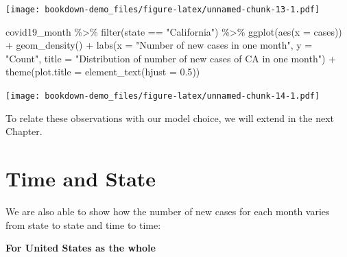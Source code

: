 \documentclass[
]{book}
\newenvironment{Shaded}{\begin{snugshade}}{\end{snugshade}}
\newcommand{\AttributeTok}[1]{\textcolor[rgb]{0.77,0.63,0.00}{#1}}
\newcommand{\FloatTok}[1]{\textcolor[rgb]{0.00,0.00,0.81}{#1}}
\newcommand{\FunctionTok}[1]{\textcolor[rgb]{0.00,0.00,0.00}{#1}}
\newcommand{\NormalTok}[1]{#1}
\newcommand{\SpecialCharTok}[1]{\textcolor[rgb]{0.00,0.00,0.00}{#1}}
\newcommand{\StringTok}[1]{\textcolor[rgb]{0.31,0.60,0.02}{#1}}
\begin{document}
\texttt{[image: bookdown-demo\_files/figure-latex/unnamed-chunk-13-1.pdf]}

\begin{Shaded}
\begin{Highlighting}[]
\NormalTok{covid19\_month }\SpecialCharTok{\%\textgreater{}\%}
  \FunctionTok{filter}\NormalTok{(state }\SpecialCharTok{==} \StringTok{"California"}\NormalTok{) }\SpecialCharTok{\%\textgreater{}\%}
  \FunctionTok{ggplot}\NormalTok{(}\FunctionTok{aes}\NormalTok{(}\AttributeTok{x =}\NormalTok{ cases)) }\SpecialCharTok{+}
  \FunctionTok{geom\_density}\NormalTok{() }\SpecialCharTok{+}
  \FunctionTok{labs}\NormalTok{(}\AttributeTok{x =} \StringTok{"Number of new cases in one month"}\NormalTok{, }\AttributeTok{y =} \StringTok{"Count"}\NormalTok{, }\AttributeTok{title =} \StringTok{"Distribution of number of new cases of CA in one month"}\NormalTok{) }\SpecialCharTok{+}
  \FunctionTok{theme}\NormalTok{(}\AttributeTok{plot.title =} \FunctionTok{element\_text}\NormalTok{(}\AttributeTok{hjust =} \FloatTok{0.5}\NormalTok{))}
\end{Highlighting}
\end{Shaded}

\texttt{[image: bookdown-demo\_files/figure-latex/unnamed-chunk-14-1.pdf]}

To relate these observations with our model choice, we will extend in the next Chapter.

\hypertarget{time-and-state}{%
\section{Time and State}\label{time-and-state}}

We are also able to show how the number of new cases for each month varies from state to state and time to time:

\textbf{For United States as the whole}
\end{document}
